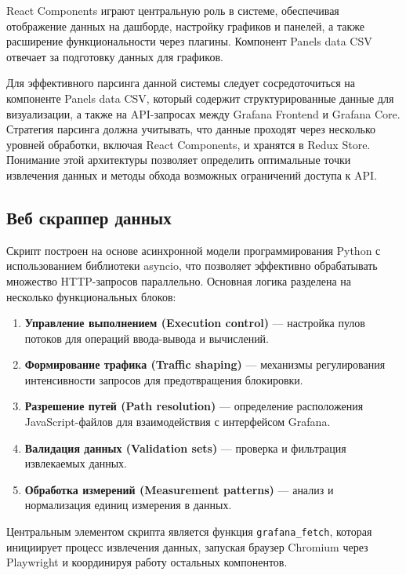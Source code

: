 React Components играют центральную роль в системе, обеспечивая отображение
данных на дашборде, настройку графиков и панелей, а также расширение
функциональности через плагины. Компонент Panels data CSV отвечает за
подготовку данных для графиков.

Для эффективного парсинга данной системы следует сосредоточиться на компоненте
Panels data CSV, который содержит структурированные данные для визуализации, а
также на API-запросах между Grafana Frontend и Grafana Core. Стратегия парсинга
должна учитывать, что данные проходят через несколько уровней обработки,
включая React Components, и хранятся в Redux Store. Понимание этой архитектуры
позволяет определить оптимальные точки извлечения данных и методы обхода
возможных ограничений доступа к API.

\subsection{Веб скраппер данных}

Скрипт построен на основе асинхронной модели программирования Python с
использованием библиотеки asyncio, что позволяет эффективно обрабатывать
множество HTTP-запросов параллельно. Основная логика разделена на несколько
функциональных блоков:

\begin{enumerate}
	\item \textbf{Управление выполнением (Execution control)} --- настройка пулов потоков для операций ввода-вывода и вычислений.
	\item \textbf{Формирование трафика (Traffic shaping)} --- механизмы регулирования интенсивности запросов для предотвращения блокировки.
	\item \textbf{Разрешение путей (Path resolution)} --- определение расположения JavaScript-файлов для взаимодействия с интерфейсом Grafana.
	\item \textbf{Валидация данных (Validation sets)} --- проверка и фильтрация извлекаемых данных.
	\item \textbf{Обработка измерений (Measurement patterns)} --- анализ и нормализация единиц измерения в данных.
\end{enumerate}

Центральным элементом скрипта является функция \texttt{grafana\_fetch}, которая
инициирует процесс извлечения данных, запуская браузер Chromium через
Playwright и координируя работу остальных компонентов.


